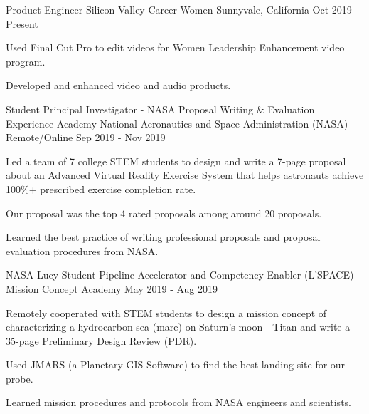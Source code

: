 

\begin{cventries}

  \cventry
    {Product Engineer} %
    {Silicon Valley Career Women} %
    {Sunnyvale, California} %
    {Oct 2019 - Present} %
    {
	\begin{cvitems} %
      	\item Used Final Cut Pro to edit videos for Women Leadership Enhancement video program.
      	\item Developed and enhanced video and audio products.
	\end{cvitems}
    }
    
  \cventry
    {Student Principal Investigator - NASA Proposal Writing \& Evaluation Experience Academy} %
    {National Aeronautics and Space Administration (NASA)} %
    {Remote/Online} %
    {Sep 2019 - Nov 2019} %
    {
	\begin{cvitems} %
      	\item Led a team of 7 college STEM students to design and write a 7-page proposal about an Advanced Virtual Reality Exercise System that helps astronauts achieve 100\%+ prescribed exercise completion rate. 
      	\item Our proposal was the top 4 rated proposals among around 20 proposals.
      	\item Learned the best practice of writing professional proposals and proposal evaluation procedures from NASA.
	\end{cvitems}
    }
   
   \cventry
    {NASA Lucy Student Pipeline Accelerator and Competency Enabler (L'SPACE) Mission Concept Academy} %
    {} %
    {} %
    {May 2019 - Aug 2019} %
    {
	\begin{cvitems} %
      	\item Remotely cooperated with STEM students to design a mission concept of characterizing a hydrocarbon sea (mare) on Saturn’s moon - Titan and write a 35-page Preliminary Design Review (PDR). 
      	\item Used JMARS (a Planetary GIS Software) to find the best landing site for our probe.
      	\item Learned mission procedures and protocols from NASA engineers and scientists.
	\end{cvitems}
    }
    

\end{cventries}
